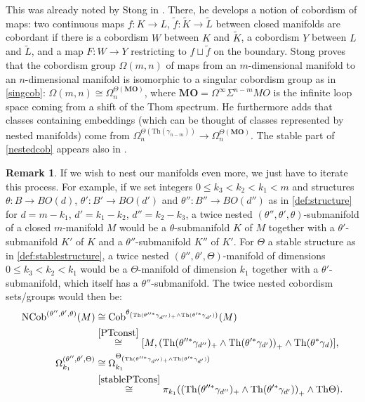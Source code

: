 \documentclass[a4paper, 11pt,reqno]{amsart}
\theoremstyle{plain}
\theoremstyle{definition}
\newtheorem{remark}[theorem]{Remark}
\newcommand{\Th}{\mathrm{Th}}
\begin{document}
This was already noted by Stong in \cite{cobofmaps}. There, he develops a notion of cobordism of maps: two continuous maps $f\colon K\to L$, $\widetilde{f}\colon \widetilde{K}\to\widetilde{L}$ between closed manifolds are cobordant if there is a cobordism $W$ between $K$ and $\widetilde{K}$, a cobordism $Y$ between $L$ and $\widetilde{L}$, and a map $F\colon W\to Y$ restricting to $f\sqcup\widetilde{f}$ on the boundary. Stong proves that the cobordism group $\Omega(m,n)$ of maps from an $m$-dimensional manifold to an $n$-dimensional manifold is isomorphic to a singular cobordism group as in \cref{singcob}: $\Omega(m,n)\cong\Omega_n^{\Theta({\mathbf{MO}})}$, where $\mathbf{MO}= \Omega^\infty\Sigma^{n-m}MO$ is the infinite loop space coming from a shift of the Thom spectrum. He furthermore adds that classes containing embeddings (which can be thought of classes represented by nested manifolds) come from $\Omega_n^{\Theta({\Th(\gamma_{n-m})})}\to\Omega_n^{\Theta({\mathbf{MO}})}$. The stable part of \cref{nestedcob} appears also in \cite[Lemma 8.4.9]{Wallbook}.\par
\begin{remark} If we wish to nest our manifolds even more, we just have to iterate this process. For example, if we set integers $0\leq k_3<k_2<k_1<m$ and structures $\theta\colon B\to BO(d)$, $\theta'\colon B'\to BO(d')$ and  $\theta''\colon B''\to BO(d'')$ as in \cref{def:structure} for $d=m-k_1$, $d'=k_1-k_2$, $d''=k_2-k_3$, a twice nested $(\theta'',\theta',\theta)$-submanifold of a closed $m$-manifold $M$ would be a $\theta$-submanifold $K$ of $M$ together with a $\theta'$-submanifold $K'$ of $K$ and a $\theta''$-submanifold $K''$ of $K'$. For $\Theta$ a stable structure as in \cref{def:stablestructure}, a twice nested $(\theta'',\theta',\Theta)$-manifold of dimensions $0\leq k_3<k_2<k_1$ would be a $\Theta$-manifold of dimension $k_1$ together with a $\theta'$-submanifold, which itself has a $\theta''$-submanifold. The twice nested cobordism sets/groups would then be:
\begin{align*}
    \mathrm{NCob}^{(\theta'',\theta',\theta)}(M)&\cong\mathrm{Cob}^{\theta_{\left(\Th(\theta''^\ast\gamma_{d''})_+\wedge\Th(\theta'^\ast\gamma_{d'})\right)}}(M)\\
    &\stackrel{\ref{PTconst}}{\cong}[M,\left(\Th(\theta''^\ast\gamma_{d''})_+\wedge\Th(\theta'^\ast\gamma_{d'})\right)_+\wedge \Th(\theta^\ast\gamma_{d})],\\
\Omega_{k_1}^{(\theta'',\theta',\Theta)}&\cong\Omega_{k_1}^{\Theta_{\left(\Th(\theta''^\ast\gamma_{d''})_+\wedge\Th(\theta'^\ast\gamma_{d'})\right)}}\\
&\stackrel{\ref{stablePTcons}}{\cong}\pi_{k_1}(\left(\Th(\theta''^\ast\gamma_{d''})_+\wedge\Th(\theta'^\ast\gamma_{d'})\right)_+\wedge\Th\Theta). 
\end{align*}
\end{remark}
\end{document}

